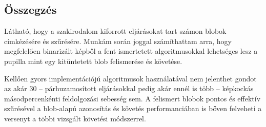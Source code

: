 \subsection{Összegzés}\label{sect:blob_osszegzes}

Látható, hogy a szakirodalom kiforrott eljárásokat tart számon blobok címkézésére és szűrésére. Munkám során joggal számíthattam arra, hogy megfelelően binarizált képből a fent ismertetett algoritmusokkal lehetséges lesz a pupilla mint egy kitüntetett blob felismerése és követése.

Kellően gyors implementációjú algoritmusok használatával nem jelenthet gondot az akár 30 -- párhuzamosított eljárásokkal pedig akár ennél is több -- képkockás másodpercenkénti feldolgozási sebesség sem. A felismert blobok pontos és effektív szűrésével a blob-alapú azonosítás és követés performanciában is bőven felveheti a versenyt a többi vizsgált követési módszerrel.